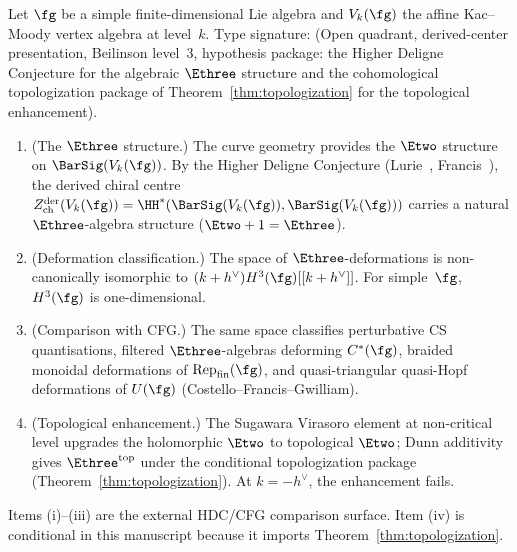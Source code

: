 \begin{theorem}
\label{thm:e3-cs}
\ClaimStatusConditional
Let $\fg$ be a simple finite-dimensional Lie algebra and
$V_k(\fg)$ the affine Kac--Moody vertex algebra at level~$k$.
Type signature: \textup{(}Open quadrant, derived-center
presentation, Beilinson level~$3$, hypothesis package: the Higher
Deligne Conjecture for the algebraic $\Ethree$ structure and the
cohomological topologization package of
Theorem~\ref{thm:topologization} for the topological enhancement\textup{)}.
\begin{enumerate}[label=\textup{(\roman*)}]
\item \textup{(The $\Ethree$ structure.)}
 The curve geometry provides the $\Etwo$ structure on
 $\BarSig(V_k(\fg))$. By the Higher Deligne Conjecture
 \textup{(}Lurie~\cite{HA}, Francis~\cite{Francis2013}\textup{)},
 the derived chiral centre
 $Z^{\mathrm{der}}_{\mathrm{ch}}(V_k(\fg))
 = \HH^*(\BarSig(V_k(\fg)), \BarSig(V_k(\fg)))$
 carries a natural $\Ethree$-algebra structure
 \textup{(}$\Etwo + 1 = \Ethree$\textup{)}.
\item \textup{(Deformation classification.)}
 The space of $\Ethree$-deformations is
 non-canonically isomorphic to
 $(k+h^\vee) H^3(\fg)[[k+h^\vee]]$. For simple~$\fg$,
 $H^3(\fg)$ is one-dimensional.
\item \textup{(Comparison with CFG.)}
 The same space classifies perturbative CS quantisations,
 filtered $\Ethree$-algebras deforming $C^*(\fg)$,
 braided monoidal deformations of
 $\mathrm{Rep}_{\mathrm{fin}}(\fg)$, and
 quasi-triangular quasi-Hopf deformations of $U(\fg)$
 \textup{(}Costello--Francis--Gwilliam\textup{)}.
\item \textup{(Topological enhancement.)}
 The Sugawara Virasoro element at non-critical level
 upgrades the holomorphic $\Etwo$ to topological $\Etwo$;
 Dunn additivity gives $\Ethree^{\mathrm{top}}$
 under the conditional topologization package
 \textup{(}Theorem~\textup{\ref{thm:topologization}}\textup{)}.
 At $k = -h^\vee$, the enhancement fails.
\end{enumerate}
Items \textup{(i)--(iii)} are the external HDC/CFG comparison
surface. Item \textup{(iv)} is conditional in this manuscript because
it imports Theorem~\ref{thm:topologization}.
\end{theorem}

